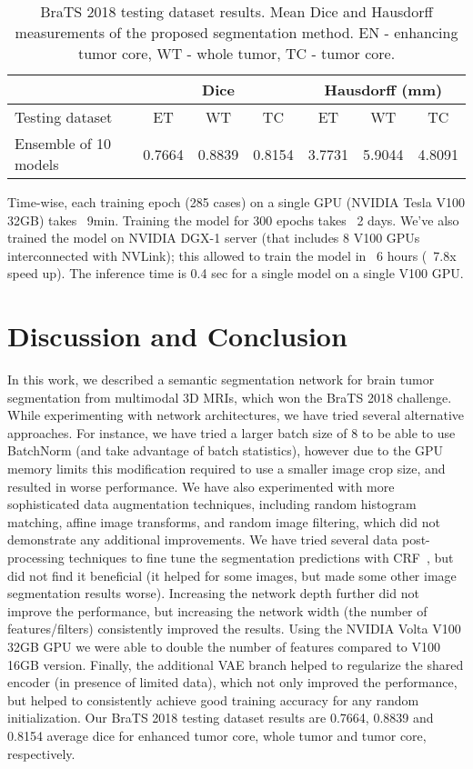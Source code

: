 \documentclass[runningheads]{llncs}
\newcommand{\0}{\ensuremath{\mathbf{0}}}
\newcommand{\1}{\ensuremath{\mathbf{1}}}
\begin{document}
\begin{table}
	\centering
\caption{BraTS 2018 testing dataset results. Mean Dice and Hausdorff measurements of the proposed segmentation method.  EN - enhancing tumor core, WT - whole tumor, TC - tumor core.}
	\label{tab:testresults}
	\begin{tabular}{l|c|c|c|c|c|c}
		\hline
		& \multicolumn{3}{c|}{Dice} & \multicolumn{3}{c}{Hausdorff (mm)}  \\ \hline
		Testing dataset  & ET & WT & TC & ET & WT & TC \\ \hline
		Ensemble of 10 models & 0.7664 & 0.8839 & 0.8154 & 3.7731 & 5.9044 & 4.8091 \\

		\hline
	\end{tabular}

\end{table}

Time-wise, each training epoch (285 cases) on a single GPU (NVIDIA Tesla V100 32GB) takes ~9min. Training the model for 300 epochs takes ~2 days. We've also trained the model on NVIDIA DGX-1 server (that includes 8 V100 GPUs  interconnected with NVLink); this allowed to train the model in ~6 hours (~7.8x speed up). The inference time is 0.4 sec for a single model on a single V100 GPU.



 
\section{Discussion and Conclusion}
 \label{sec:conclusion}
 
In this work, we described a semantic segmentation network for brain tumor segmentation from multimodal 3D MRIs, which won the BraTS 2018 challenge. 
While experimenting with network architectures, we have tried several alternative approaches. For instance, we have tried a larger batch size of 8  to be able to use BatchNorm (and take advantage of batch statistics), however due to the GPU memory limits this modification required to use a smaller image crop size, and resulted in worse performance. We have also experimented with more sophisticated data augmentation techniques, including random histogram matching, affine image transforms, and random image filtering, which did not demonstrate any additional improvements.  We have tried several data post-processing techniques to fine tune the segmentation predictions with CRF~\cite{Kamnitsas16}, but did not find it beneficial (it helped for some images, but made some other image segmentation results worse).  Increasing the network depth further did not improve the performance, but increasing the network width (the number of features/filters) consistently improved the results. Using the NVIDIA Volta V100 32GB GPU we were able to double the number of features compared to V100 16GB version. Finally, the additional VAE branch helped to regularize the shared encoder (in presence of limited data), which not only improved the performance, but helped to consistently achieve good training accuracy for any random initialization.  Our BraTS 2018 testing dataset results are 0.7664, 0.8839 and 0.8154 average dice for enhanced tumor core, whole tumor and tumor core, respectively. 




\end{document}
